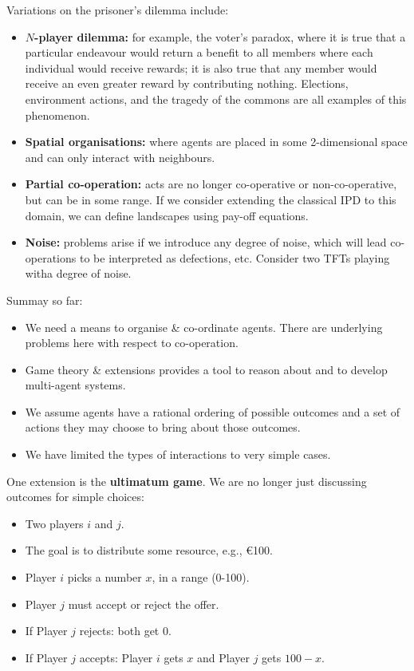 \documentclass[a4paper,11pt]{article}
\begin{document}
Variations on the prisoner's dilemma include:
\begin{itemize}
    \item   \textbf{$N$-player dilemma:} for example, the voter's paradox, where it is true that a particular endeavour would return a benefit to all members where each individual would receive rewards;
            it is also true that any member would receive an even greater reward by contributing nothing.
            Elections, environment actions, and the tragedy of the commons are all examples of this phenomenon.

    \item   \textbf{Spatial organisations:} where agents are placed in some 2-dimensional space and can only interact with neighbours.

    \item   \textbf{Partial co-operation:} acts are no longer co-operative or non-co-operative, but can be in some range.
            If we consider extending the classical IPD to this domain, we can define landscapes using pay-off equations.

    \item   \textbf{Noise:} problems arise if we introduce any degree of noise, which will lead co-operations to be interpreted as defections, etc.
            Consider two TFTs playing witha  degree of noise.
\end{itemize}

Summay so far:
\begin{itemize}
    \item   We need a means to organise \& co-ordinate agents.
            There are underlying problems here with respect to co-operation.

    \item   Game theory \& extensions provides a tool to reason about and to develop multi-agent systems.

    \item   We assume agents have a rational ordering of possible outcomes and a set of actions they may choose to bring about those outcomes.

    \item   We have limited the types of interactions to very simple cases.
\end{itemize}

One extension is the \textbf{ultimatum game}.
We are no longer just discussing outcomes for simple choices:
\begin{itemize}
    \item   Two players $i$ and $j$.
    \item   The goal is to distribute some resource, e.g., €100.
    \item   Player $i$ picks a number $x$, in a range (0-100).
    \item   Player $j$ must accept or reject the offer.
    \item   If Player $j$ rejects: both get 0.
    \item   If Player $j$ accepts: Player $i$ gets $x$ and Player $j$ gets $100-x$.
\end{itemize}
\end{document}

